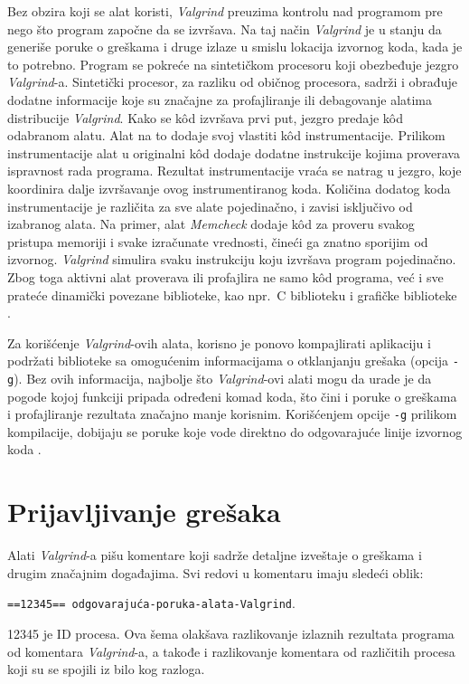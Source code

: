 \documentclass[12pt,oneside]{memoir}
\theoremstyle{plain}
\theoremstyle{definition}
\begin{document}
Bez obzira koji se alat koristi, \textit{Valgrind} preuzima kontrolu nad programom pre nego što program započne da se izvršava. Na taj način \textit{Valgrind} je u stanju da generiše poruke o greškama i druge izlaze u smislu lokacija izvornog koda, kada je to potrebno. Program se pokreće na sintetičkom procesoru koji obezbeđuje jezgro \textit{Valgrind}-a. Sintetički procesor, za razliku od običnog procesora, sadrži i obrađuje dodatne informacije koje su značajne za profajliranje ili debagovanje alatima distribucije \textit{Valgrind}. Kako se k\^od izvršava prvi put, jezgro predaje k\^od odabranom alatu. Alat na to dodaje svoj vlastiti k\^od instrumentacije. Prilikom instrumentacije alat u originalni  k\^od dodaje dodatne instrukcije kojima proverava ispravnost rada programa. Rezultat instrumentacije vraća se natrag u jezgro, koje koordinira dalje izvršavanje ovog instrumentiranog koda. Količina dodatog koda instrumentacije je različita za sve alate pojedinačno, i zavisi isključivo od izabranog alata. Na primer, alat \textit{Memcheck} dodaje k\^od za proveru svakog pristupa memoriji i svake izračunate vrednosti, čineći ga znatno sporijim od izvornog. \textit{Valgrind} simulira svaku instrukciju koju izvršava program pojedinačno. Zbog toga aktivni alat proverava ili profajlira ne samo k\^od programa, već i sve prateće dinamički povezane biblioteke, kao npr.~C biblioteku i grafičke biblioteke \cite{ValgrindCore}.

Za korišćenje \textit{Valgrind}-ovih alata, korisno je ponovo kompajlirati aplikaciju i podržati biblioteke sa omogućenim informacijama o otklanjanju grešaka (opcija \texttt{-g}). Bez ovih informacija, najbolje što \textit{Valgrind}-ovi alati mogu da urade je da pogode kojoj funkciji pripada određeni komad koda, što čini i poruke o greškama i profajliranje rezultata značajno manje korisnim. Korišćenjem opcije \texttt{-g} prilikom kompilacije, dobijaju se poruke koje vode direktno do odgovarajuće linije izvornog koda \cite{ValgrindCore}.

\section{Prijavljivanje grešaka}
Alati \textit{Valgrind}-a pišu komentare koji sadrže detaljne izveštaje o greškama i drugim značajnim događajima. Svi redovi u komentaru imaju sledeći oblik:
\begin{center}
\texttt{==12345== odgovarajuća-poruka-alata-Valgrind}.
\end{center}
12345 je ID procesa. Ova šema olakšava razlikovanje izlaznih rezultata programa od komentara \textit{Valgrind}-a, a takođe i razlikovanje komentara od različitih procesa koji su se spojili iz bilo kog razloga.
\end{document}
